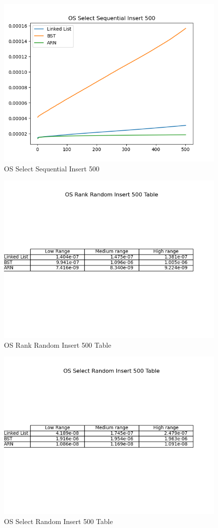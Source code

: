 \documentclass[11pt]{article}
\begin{document}
 \begin{figure}[H]
  \centering
  \includegraphics[width=0.8\linewidth]{Images/500/OS Select Sequential Insert 500.png}
  \caption{OS Select Sequential Insert 500 }
  \label{fig:OS Select Sequential Insert 500}
\end{figure}
 \begin{figure}[H]
  \centering
  \includegraphics[width=0.8\linewidth]{Images/500/OS Rank Random Insert 500 Table.png}
  \caption{OS Rank Random Insert 500 Table }
  \label{fig:OS Rank Random Insert 500 Table}
\end{figure}
 \begin{figure}[H]
  \centering
  \includegraphics[width=0.8\linewidth]{Images/500/OS Select Random Insert 500 Table.png}
  \caption{OS Select Random Insert 500 Table }
  \label{fig:OS Select Random Insert 500 Table}
\end{figure}
\end{document}
